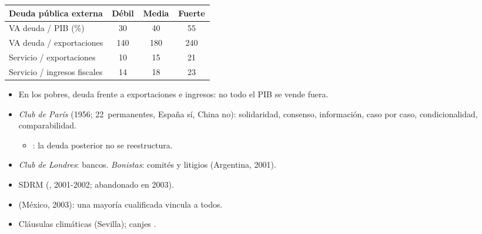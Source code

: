 \documentclass{article}
\begin{document}
\begin{columnas}
\begin{minipage}{\linewidth}
\begin{itemize}
\end{itemize}
{\small\noindent\begin{tabular}{@{}>{\raggedright\arraybackslash}p{0.5\linewidth}|c|c|c@{}}
\textbf{Deuda pública externa} & \textbf{Débil} & \textbf{Media} & \textbf{Fuerte}\\ \hline
VA deuda / PIB (\%) & 30 & 40 & 55\\
VA deuda / exportaciones & 140 & 180 & 240\\
Servicio / exportaciones & 10 & 15 & 21\\
Servicio / ingresos fiscales & 14 & 18 & 23\\
\end{tabular}\par}
\end{minipage}
\begin{itemize}
\item En los pobres, deuda frente a exportaciones e ingresos: no todo el PIB se vende fuera.
\end{itemize}
\begin{itemize}
\item \emph{Club de París} (1956; 22~permanentes, España sí, China no): solidaridad, consenso, información, caso por caso, condicionalidad, comparabilidad.
  \begin{itemize}
  \item {}: la deuda posterior no se reestructura.
  \end{itemize}
\item \emph{Club de Londres}: bancos. \emph{Bonistas}: comités y litigios (Argentina, 2001).
\end{itemize}
\begin{itemize}
\item SDRM (, 2001-2002; abandonado en 2003).
\item {} (México, 2003): una mayoría cualificada vincula a todos.
\item Cláusulas climáticas (Sevilla); canjes .
\end{itemize}


\end{columnas}
\end{document}
